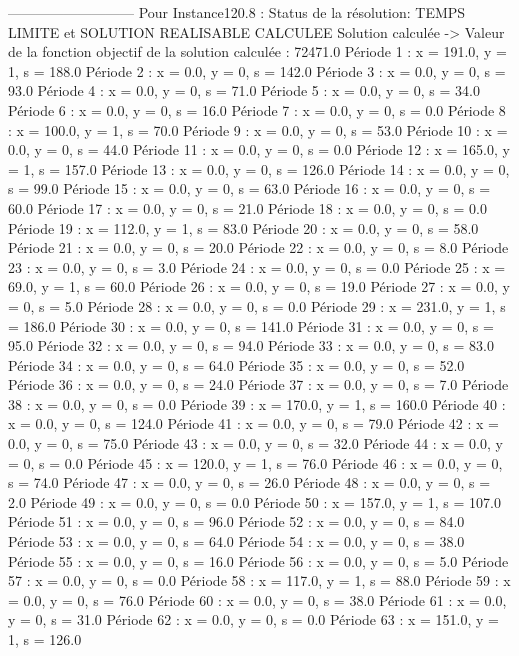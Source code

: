 ---------------------------
Pour Instance120.8 :
Status de la résolution: TEMPS LIMITE et SOLUTION REALISABLE CALCULEE
Solution calculée
-> Valeur de la fonction objectif de la solution calculée :  72471.0
Période 1 : x = 191.0, y = 1, s = 188.0
Période 2 : x = 0.0, y = 0, s = 142.0
Période 3 : x = 0.0, y = 0, s = 93.0
Période 4 : x = 0.0, y = 0, s = 71.0
Période 5 : x = 0.0, y = 0, s = 34.0
Période 6 : x = 0.0, y = 0, s = 16.0
Période 7 : x = 0.0, y = 0, s = 0.0
Période 8 : x = 100.0, y = 1, s = 70.0
Période 9 : x = 0.0, y = 0, s = 53.0
Période 10 : x = 0.0, y = 0, s = 44.0
Période 11 : x = 0.0, y = 0, s = 0.0
Période 12 : x = 165.0, y = 1, s = 157.0
Période 13 : x = 0.0, y = 0, s = 126.0
Période 14 : x = 0.0, y = 0, s = 99.0
Période 15 : x = 0.0, y = 0, s = 63.0
Période 16 : x = 0.0, y = 0, s = 60.0
Période 17 : x = 0.0, y = 0, s = 21.0
Période 18 : x = 0.0, y = 0, s = 0.0
Période 19 : x = 112.0, y = 1, s = 83.0
Période 20 : x = 0.0, y = 0, s = 58.0
Période 21 : x = 0.0, y = 0, s = 20.0
Période 22 : x = 0.0, y = 0, s = 8.0
Période 23 : x = 0.0, y = 0, s = 3.0
Période 24 : x = 0.0, y = 0, s = 0.0
Période 25 : x = 69.0, y = 1, s = 60.0
Période 26 : x = 0.0, y = 0, s = 19.0
Période 27 : x = 0.0, y = 0, s = 5.0
Période 28 : x = 0.0, y = 0, s = 0.0
Période 29 : x = 231.0, y = 1, s = 186.0
Période 30 : x = 0.0, y = 0, s = 141.0
Période 31 : x = 0.0, y = 0, s = 95.0
Période 32 : x = 0.0, y = 0, s = 94.0
Période 33 : x = 0.0, y = 0, s = 83.0
Période 34 : x = 0.0, y = 0, s = 64.0
Période 35 : x = 0.0, y = 0, s = 52.0
Période 36 : x = 0.0, y = 0, s = 24.0
Période 37 : x = 0.0, y = 0, s = 7.0
Période 38 : x = 0.0, y = 0, s = 0.0
Période 39 : x = 170.0, y = 1, s = 160.0
Période 40 : x = 0.0, y = 0, s = 124.0
Période 41 : x = 0.0, y = 0, s = 79.0
Période 42 : x = 0.0, y = 0, s = 75.0
Période 43 : x = 0.0, y = 0, s = 32.0
Période 44 : x = 0.0, y = 0, s = 0.0
Période 45 : x = 120.0, y = 1, s = 76.0
Période 46 : x = 0.0, y = 0, s = 74.0
Période 47 : x = 0.0, y = 0, s = 26.0
Période 48 : x = 0.0, y = 0, s = 2.0
Période 49 : x = 0.0, y = 0, s = 0.0
Période 50 : x = 157.0, y = 1, s = 107.0
Période 51 : x = 0.0, y = 0, s = 96.0
Période 52 : x = 0.0, y = 0, s = 84.0
Période 53 : x = 0.0, y = 0, s = 64.0
Période 54 : x = 0.0, y = 0, s = 38.0
Période 55 : x = 0.0, y = 0, s = 16.0
Période 56 : x = 0.0, y = 0, s = 5.0
Période 57 : x = 0.0, y = 0, s = 0.0
Période 58 : x = 117.0, y = 1, s = 88.0
Période 59 : x = 0.0, y = 0, s = 76.0
Période 60 : x = 0.0, y = 0, s = 38.0
Période 61 : x = 0.0, y = 0, s = 31.0
Période 62 : x = 0.0, y = 0, s = 0.0
Période 63 : x = 151.0, y = 1, s = 126.0
